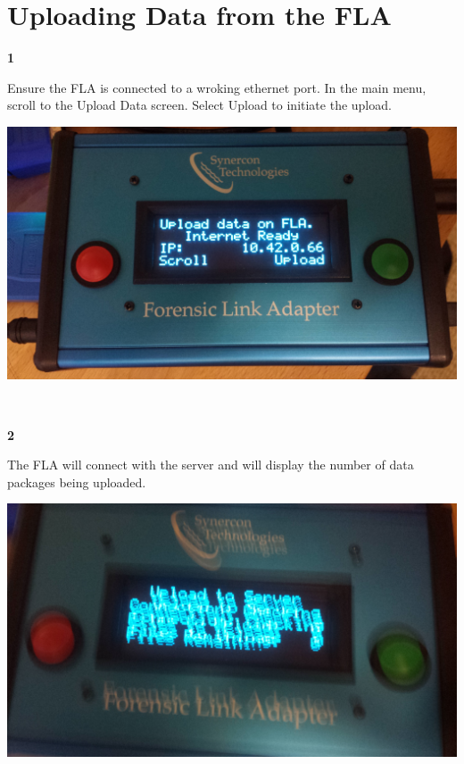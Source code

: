 \documentclass[11pt, oneside]{book}
\begin{document}
\section{Uploading Data from the FLA}
\label{subsec:upload_data}
\noindent\begin{minipage}{0.45\textwidth}%
\begin{center}
\textbf{1}\\[\baselineskip]
\end{center}
Ensure the FLA is connected to a wroking ethernet port. In the main menu, scroll to the Upload Data screen. Select Upload to initiate the upload.
\end{minipage}%
\hfill%
\begin{minipage}{0.45\textwidth}
\includegraphics[width=\linewidth]{../media/fla_screens/upload_ready}
\end{minipage}
\\[\baselineskip]
\noindent\begin{minipage}{0.45\textwidth}%
\begin{center}
\textbf{2}\\[\baselineskip]
\end{center}
The FLA will connect with the server and will display the number of data packages being uploaded.
\end{minipage}%
\hfill%
\begin{minipage}{0.45\textwidth}
\includegraphics[width=\linewidth]{../media/fla_screens/upload_checking}
\end{minipage}
\end{document}
